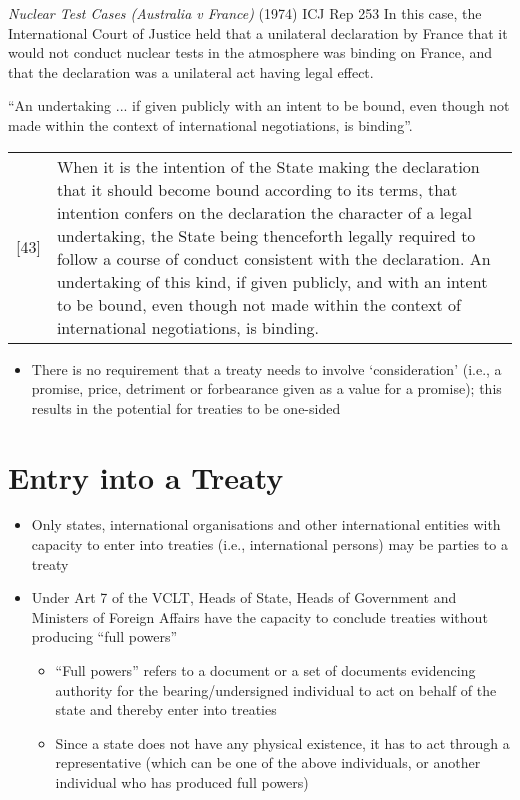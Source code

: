 \begin{casedetails}{\textit{Nuclear Test Cases (Australia v France)} (1974) ICJ Rep 253}
    \flushleft
    In this case, the International Court of Justice held that a unilateral declaration by France that it would not conduct nuclear tests in the atmosphere was binding on France, and that the declaration was a unilateral act having legal effect.
    
    \vspace{\baselineskip}

    ``An undertaking ... if given publicly with an intent to be bound, even though not made within the context of international negotiations, is binding''.

    \begin{longtable}{p{}|>{\raggedright\arraybackslash}p{}}
       [43] & When it is the intention of the State making the declaration that it should become bound according to its terms, that intention confers on the declaration the character of a legal undertaking, the State being thenceforth legally required to follow a course of conduct consistent with the declaration. An undertaking of this kind, if given publicly, and with an intent to be bound, even though not made within the context of international negotiations, is binding.
    \end{longtable} 

\end{casedetails}

\begin{itemize}
    \item There is no requirement that a treaty needs to involve `consideration' (i.e., a promise, price, detriment or forbearance given as a value for a promise); this results in the potential for treaties to be one-sided
\end{itemize}

\section{Entry into a Treaty}
\begin{itemize}
    \item Only states, international organisations and other international entities with capacity to enter into treaties (i.e., international persons) may be parties to a treaty
    \item Under Art 7 of the VCLT, Heads of State, Heads of Government and Ministers of Foreign Affairs have the capacity to conclude treaties without producing ``full powers''
    \begin{itemize}
        \item ``Full powers'' refers to a document or a set of documents evidencing authority for the bearing/undersigned individual to act on behalf of the state and thereby enter into treaties
        \item Since a state does not have any physical existence, it has to act through a representative (which can be one of the above individuals, or another individual who has produced full powers)
    \end{itemize}
\end{itemize}

